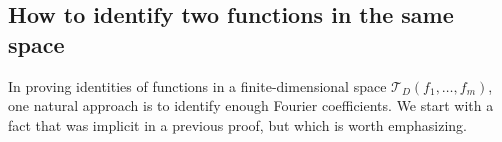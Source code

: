 \documentclass[reqno,11pt]{amsart}
\theoremstyle{definition}
\newtheorem{example}[theorem]{Example}
\theoremstyle{remark}
\numberwithin{equation}{section}
\newcommand{\Z}{\mathbb{Z}}
\newcommand{\Hminus}{{\mathbb{H}^{\textnormal{-}\hspace{-0.03cm}}}}
\newcommand{\mT}{\mathcal{T}}
\newcommand{\vect}[2]{\big[{#1};{#2}\big]}
\newcommand{\fix}[1]{\textcolor{blue}{\large (#1)\normalsize}}
\begin{document}

\subsection{How to identify two functions in the same space} \label{subsec:identification}

In proving identities of functions in a finite-dimensional space $\mT_D(f_1, \ldots, f_m)$, one natural approach is to identify enough Fourier coefficients. We start with a fact that was implicit in a previous proof, but which is worth emphasizing.
\end{document}
